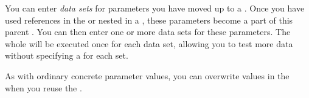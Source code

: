 \label{datasetsconcepts}

You can enter \emph{data sets} for parameters you have moved up to a \gdcase{}. Once you have used references in the \gdsteps{} or \gdcases{} nested in a  \gdcase{}, these parameters become a part of this parent \gdcase{}. You can then enter one or more data sets for these parameters. The whole \gdcase{} will be executed once for each data set, allowing you to test more data without specifying a \gdcase{} for each set.  

As with ordinary concrete parameter values, you can overwrite values in the \gddatasetsview{} when you reuse the \gdcase{}. 